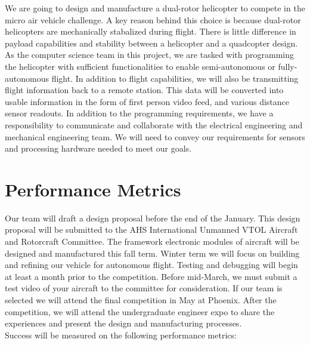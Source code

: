 \documentclass[onecolumn, draftclsnofoot,10pt, compsoc]{IEEEtran}
\begin{document}
We are going to design and manufacture a dual-rotor helicopter to compete in the micro air vehicle challenge. A key reason behind this choice is because dual-rotor helicopters are mechanically stabalized during flight. There is little difference in payload capabilities and stability between a helicopter and a quadcopter design. As the computer science team in this project, we are tasked with programming the helicopter with sufficient functionalities to enable semi-autonomous or fully-autonomous flight. In addition to flight capabilities, we will also be transmitting flight information back to a remote station. This data will be converted into usable information in the form of first person video feed, and various distance sensor readouts. In addition to the programming requirements, we have a responsibility to communicate and collaborate with the electrical engineering and mechanical engineering team. We will need to convey our requirements for sensors and processing hardware needed to meet our goals.\\


\section{Performance Metrics}

Our team will draft a design proposal before the end of the January. This design proposal will be submitted to the AHS International Unmanned VTOL Aircraft and Rotorcraft Committee. The framework electronic modules of aircraft will be designed and manufactured this fall term. Winter term we will focus on building and refining our vehicle for autonomous flight. Testing and debugging will begin at least a month prior to the competition. Before mid-March, we must submit a test video of your aircraft to the committee for consideration. If our team is selected we will attend the final competition in May at Phoenix. After the competition, we will attend the undergraduate engineer expo to share the experiences and present the design and manufacturing processes.\\
Success will be measured on the following performance metrics:
\end{document}
